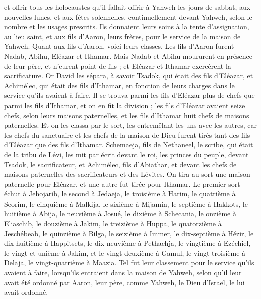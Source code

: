 \begin{multicols}{2}
et offrir tous les holocaustes qu'il fallait offrir à Yahweh les jours de sabbat, aux nouvelles lunes, et aux fêtes solennelles, continuellement devant Yahweh, selon le nombre et les usages prescrits.
Ils donnaient leurs soins à la tente d’assignation, au lieu saint, et aux fils d’Aaron, leurs frères, pour le service de la maison de Yahweh.
\VerseOne{}Quant aux fils d'Aaron, voici leurs classes. Les fils d’Aaron furent Nadab, Abihu, Eléazar et Ithamar.
Mais Nadab et Abihu moururent en présence de leur père, et n'eurent point de fils ; et Eléazar et Ithamar exercèrent la sacrificature.
Or David les sépara, à savoir Tsadok, qui était des fils d'Eléazar, et Achimélec, qui était des fils d'Ithamar, en fonction de leurs charges dans le service qu'ils avaient à faire.
Il se trouva parmi les fils d'Eléazar plus de chefs que parmi les fils d'Ithamar, et on en fit la division ; les fils d'Eléazar avaient seize chefs, selon leurs maisons paternelles, et les fils d'Ithamar huit chefs de maisons paternelles.
Et on les classa par le sort, les entremêlant les uns avec les autres, car les chefs du sanctuaire et les chefs de la maison de Dieu furent tirés tant des fils d'Eléazar que des fils d'Ithamar.
Schemaeja, fils de Nethaneel, le scribe, qui était de la tribu de Lévi, les mit par écrit devant le roi, les princes du peuple, devant Tsadok, le sacrificateur, et Achimélec, fils d'Abiathar, et devant les chefs de maisons paternelles des sacrificateurs et des Lévites. On tira au sort une maison paternelle pour Eléazar, et une autre fut tirée pour Ithamar.
Le premier sort échut à Jehojarib, le second à Jedaeja,
le troisième à Harim, le quatrième à Seorim,
le cinquième à Malkija, le sixième à Mijamin,
le septième à Hakkots, le huitième à Abija,
le neuvième à Josué, le dixième à Schecania,
le onzième à Eliaschib, le douzième à Jakim,
le treizième à Huppa, le quatorzième à Jeschébeab,
le quinzième à Bilga, le seizième à Immer,
le dix-septième à Hézir, le dix-huitième à Happitsets,
le dix-neuvième à Pethachja, le vingtième à Ezéchiel,
le vingt et unième à Jakim, et le vingt-deuxième à Gamul,
le vingt-troisième à Delaja, le vingt-quatrième à Maazia.
Tel fut leur classement pour le service qu'ils avaient à faire, lorsqu'ils entraient dans la maison de Yahweh, selon qu'il leur avait été ordonné par Aaron, leur père, comme Yahweh, le Dieu d'Israël, le lui avait ordonné.

\end{multicols}
